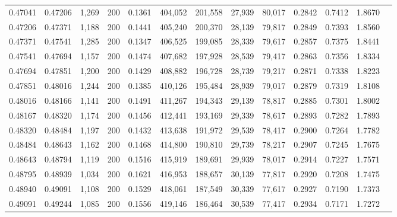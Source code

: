 \begin{tabular}{rrrrrrrrrrrrr}
0.47041 & 0.47206 &  1,269 & 200 &                                     0.1361 & 404,052 & 201,558 &  27,939 &  80,017 & 0.2842 & 0.7412 & 1.8670 \\
0.47206 & 0.47371 &  1,188 & 200 &                                     0.1441 & 405,240 & 200,370 &  28,139 &  79,817 & 0.2849 & 0.7393 & 1.8560 \\
0.47371 & 0.47541 &  1,285 & 200 &                                     0.1347 & 406,525 & 199,085 &  28,339 &  79,617 & 0.2857 & 0.7375 & 1.8441 \\
0.47541 & 0.47694 &  1,157 & 200 &                                     0.1474 & 407,682 & 197,928 &  28,539 &  79,417 & 0.2863 & 0.7356 & 1.8334 \\
0.47694 & 0.47851 &  1,200 & 200 &                                     0.1429 & 408,882 & 196,728 &  28,739 &  79,217 & 0.2871 & 0.7338 & 1.8223 \\
0.47851 & 0.48016 &  1,244 & 200 &                                     0.1385 & 410,126 & 195,484 &  28,939 &  79,017 & 0.2879 & 0.7319 & 1.8108 \\
0.48016 & 0.48166 &  1,141 & 200 &                                     0.1491 & 411,267 & 194,343 &  29,139 &  78,817 & 0.2885 & 0.7301 & 1.8002 \\
0.48167 & 0.48320 &  1,174 & 200 &                                     0.1456 & 412,441 & 193,169 &  29,339 &  78,617 & 0.2893 & 0.7282 & 1.7893 \\
0.48320 & 0.48484 &  1,197 & 200 &                                     0.1432 & 413,638 & 191,972 &  29,539 &  78,417 & 0.2900 & 0.7264 & 1.7782 \\
0.48484 & 0.48643 &  1,162 & 200 &                                     0.1468 & 414,800 & 190,810 &  29,739 &  78,217 & 0.2907 & 0.7245 & 1.7675 \\
0.48643 & 0.48794 &  1,119 & 200 &                                     0.1516 & 415,919 & 189,691 &  29,939 &  78,017 & 0.2914 & 0.7227 & 1.7571 \\
0.48795 & 0.48939 &  1,034 & 200 &                                     0.1621 & 416,953 & 188,657 &  30,139 &  77,817 & 0.2920 & 0.7208 & 1.7475 \\
0.48940 & 0.49091 &  1,108 & 200 &                                     0.1529 & 418,061 & 187,549 &  30,339 &  77,617 & 0.2927 & 0.7190 & 1.7373 \\
0.49091 & 0.49244 &  1,085 & 200 &                                     0.1556 & 419,146 & 186,464 &  30,539 &  77,417 & 0.2934 & 0.7171 & 1.7272 \\

\end{tabular}
